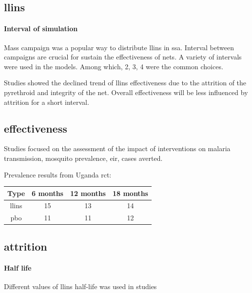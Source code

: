 \documentclass[a4paper, 12pt, twoside]{article}
\begin{document}
\subsection{\texorpdfstring{\gls{llins}}{LLINs}}%
\label{sub:llins}

\paragraph{Interval of simulation}%
\label{par:interval_of_simulation}
Mass campaign was a popular way to distribute \gls{llins} in \gls{ssa}.
Interval between campaigns are crucial for sustain the effectiveness of nets.
A variety of intervals were used in the models.
Among which, 2, 3, 4\cite{Walker2016} were the common choices.

Studies showed the declined trend of \gls{llins} effectiveness due to the attrition of the pyrethroid and integrity of the net.
Overall effectiveness will be less influenced by attrition for a short interval.

\subsection{effectiveness}
Studies focused on the assessment of the impact of interventions on malaria transmission, mosquito prevalence, \gls{eir}, cases averted.

Prevalence results from Uganda \gls{rct}\cite{Staedke2020}:
\begin{center}
	\begin{tabular}{c c c c}
		Type        & 6 months & 12 months & 18 months \\
		\hline
		\gls{llins} & 15       & 13        & 14        \\
		\gls{pbo}   & 11       & 11        & 12        \\
	\end{tabular}
\end{center}

\subsection{attrition}

\paragraph{Half life}%
\label{par:half_life}

Different values of \gls{llins} half-life was used in studies
\end{document}
